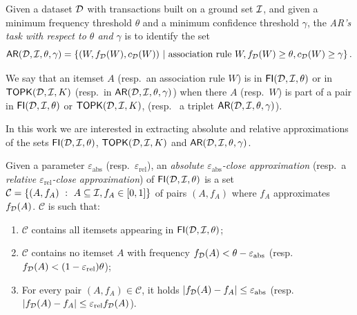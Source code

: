 \begin{definition}\label{def:minear}
  Given a dataset ${\cal D}$ with transactions
  built on a ground set ${\cal I}$, and given a minimum frequency threshold $\theta$
  and a minimum confidence threshold $\gamma$, the \emph{AR's task with respect
  to $\theta$ and $\gamma$} is to identify the set
  \[
  \mathsf{AR}({\cal D},{\cal I},\theta,\gamma)=\left\{(W,f_{\cal D}(W),c_{\cal D}(W)) ~|~ \mbox{association rule } W,
  f_{\cal D}(W)\ge\theta, c_{\cal D}(W)\ge\gamma\right\}.\]
\end{definition}

We say that an itemset $A$ (resp.~an
association rule $W$) is in $\mathsf{FI}({\cal D},{\cal I},\theta)$ or in $\mathsf{TOPK}({\cal D},{\cal I},K)$
(resp.~in $\mathsf{AR}({\cal D},{\cal I},\theta,\gamma)$) 
when there $A$ (resp.~$W$) is part of a pair in $\mathsf{FI}({\cal D},{\cal I},\theta)$ or
$\mathsf{TOPK}({\cal D},{\cal I},K)$, (resp.~ a triplet $\mathsf{AR}({\cal D},{\cal I},\theta,\gamma)$).

In this work we are interested in extracting absolute and relative
approximations of the sets $\mathsf{FI}({\cal D},{\cal I},\theta)$, $\mathsf{TOPK}({\cal D},{\cal I},K)$ and
$\mathsf{AR}({\cal D},{\cal I},\theta,\gamma)$. 

\begin{definition}\label{def:approxfi}
  Given a parameter
  $\varepsilon_{\mathrm{abs}}$ (resp.~$\varepsilon_{\mathrm{rel}}$), an
  \emph{absolute $\varepsilon_{\mathrm{abs}}$-close approximation}  (resp.~a
  \emph{relative $\varepsilon_{\mathrm{rel}}$-close approximation}) of
  $\mathsf{FI}({\cal D},{\cal I},\theta)$ is a set $\mathcal{C}=\{(A, f_A) ~:~ A\subseteq{\cal I},
  f_A\in[0,1]\}$ of pairs $(A, f_A)$ where $f_A$ approximates $f_{\cal D}(A)$.
  $\mathcal{C}$ is such that:
  \begin{enumerate}
    \item $\mathcal{C}$ contains all itemsets appearing in $\mathsf{FI}({\cal D},{\cal I},\theta)$;
    \item $\mathcal{C}$ contains no itemset $A$ with frequency $f_{\cal D}(A)<\theta -
      \varepsilon_{\mathrm{abs}}$ (resp. $f_{\cal D}(A)< (1-\varepsilon_{\mathrm{rel}})\theta$);
    \item For every pair $(A, f_A)\in\mathcal{C}$, it holds
      $|f_{\cal D}(A)-f_A|\le\varepsilon_{\mathrm{abs}}$ (resp.
      $|f_{\cal D}(A)-f_A|\le\varepsilon_\mathrm{rel}f_{\cal D}(A)$).
  \end{enumerate}
\end{definition}

